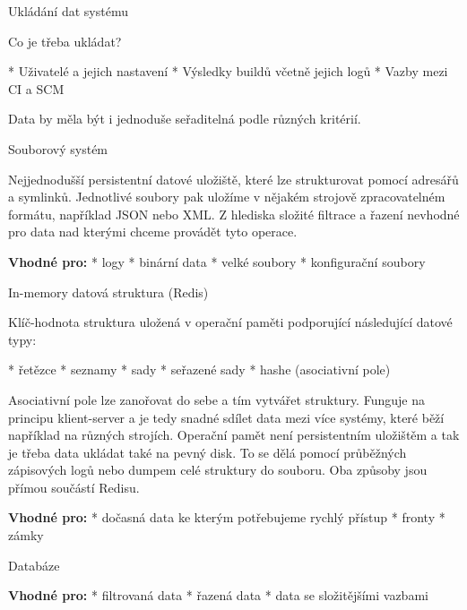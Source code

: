 \sec Ukládání dat systému

Co je třeba ukládat?

\begitems
* Uživatelé a jejich nastavení
* Výsledky buildů včetně jejich logů
* Vazby mezi CI a SCM
\enditems

\noindent
Data by měla být i jednoduše seřaditelná podle různých kritérií.

\secc Souborový systém

Nejjednodušší persistentní datové uložiště, které lze strukturovat pomocí adresářů a symlinků.
Jednotlivé soubory pak uložíme v nějakém strojově zpracovatelném formátu, například JSON nebo XML.
Z hlediska složité filtrace a řazení nevhodné pro data nad kterými chceme provádět tyto operace.

\medskip\noindent
{\bf Vhodné pro:}
\begitems
* logy
* binární data
* velké soubory
* konfigurační soubory
\enditems

\secc In-memory datová struktura (Redis)

Klíč-hodnota struktura uložená v operační paměti podporující následující datové typy:

\begitems
* řetězce
* seznamy
* sady
* seřazené sady
* hashe (asociativní pole)
\enditems

\noindent
Asociativní pole lze zanořovat do sebe a tím vytvářet struktury.
Funguje na principu klient-server a je tedy snadné sdílet data mezi více systémy, které běží například na různých strojích.
Operační pamět není persistentním uložištěm a tak je třeba data ukládat také na pevný disk.
To se dělá pomocí průběžných zápisových logů nebo dumpem celé struktury do souboru.
Oba způsoby jsou přímou součástí Redisu.

\medskip\noindent
{\bf Vhodné pro:}
\begitems
* dočasná data ke kterým potřebujeme rychlý přístup
* fronty
* zámky
\enditems

\secc Databáze

\medskip\noindent
{\bf Vhodné pro:}
\begitems
* filtrovaná data
* řazená data
* data se složitějšími vazbami
\enditems

